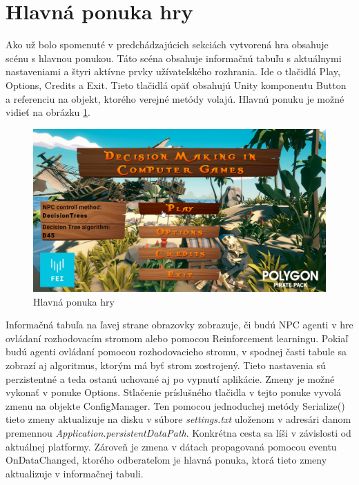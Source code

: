 \documentclass[slovak, master]{diploma}
\begin{document}
\section{Hlavná ponuka hry}
\label{sec:MainMenuAndUI}

Ako už bolo spomenuté v predchádzajúcich sekciách vytvorená hra obsahuje scénu s hlavnou ponukou. Táto scéna obsahuje informačnú tabuľu s aktuálnymi nastaveniami a štyri aktívne prvky užívateľského rozhrania. Ide o tlačidlá Play, Options, Credits a Exit. Tieto tlačidlá opäť obsahujú Unity komponentu Button a referenciu na objekt, ktorého verejné metódy volajú. Hlavnú ponuku je možné vidieť na obrázku \ref{pic:MainMenu}.

\begin{figure}[!htbp]
    \centering
    \includegraphics[width=.9\textwidth]{Figures/mainMenu.png}
    \caption{Hlavná ponuka hry}
    \label{pic:MainMenu}
\end{figure}

Informačná tabuľa na ľavej strane obrazovky zobrazuje, či budú NPC agenti v hre ovládaní rozhodovacím stromom alebo pomocou Reinforcement learningu. Pokiaľ budú agenti ovládaní pomocou rozhodovacieho stromu, v spodnej časti tabule sa zobrazí aj algoritmus, ktorým má byť strom zostrojený. Tieto nastavenia sú perzistentné a teda ostanú uchované aj po vypnutí aplikácie. Zmeny je možné vykonať v ponuke Options. Stlačenie príslušného tlačidla v tejto ponuke vyvolá zmenu na objekte ConfigManager. Ten pomocou jednoduchej metódy Serialize() tieto zmeny aktualizuje na disku v súbore \textit{settings.txt} uloženom v adresári danom premennou \textit{Application.persistentDataPath}. Konkrétna cesta sa líši v závislosti od aktuálnej platformy. Zároveň je zmena v dátach propagovaná pomocou eventu OnDataChanged, ktorého odberateľom je hlavná ponuka, ktorá tieto zmeny aktualizuje v informačnej tabuli.
\end{document}

